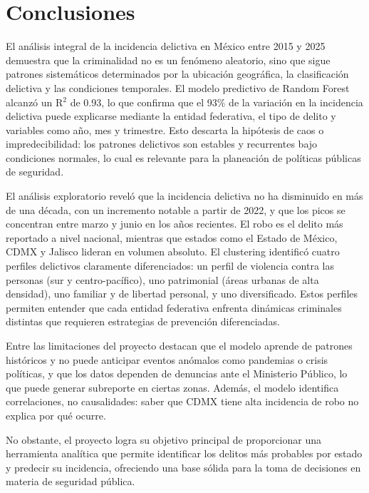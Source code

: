 \section{Conclusiones}

El análisis integral de la incidencia delictiva en México entre 2015 y 2025 demuestra que la criminalidad
no es un fenómeno aleatorio, sino que sigue patrones sistemáticos determinados por la ubicación geográfica,
la clasificación delictiva y las condiciones temporales. El modelo predictivo de Random Forest alcanzó un R$^2$
de 0.93, lo que confirma que el 93\% de la variación en la incidencia delictiva puede explicarse mediante la
entidad federativa, el tipo de delito y variables como año, mes y trimestre. Esto descarta la hipótesis de
caos o impredecibilidad: los patrones delictivos son estables y recurrentes bajo condiciones normales, lo
cual es relevante para la planeación de políticas públicas de seguridad.

El análisis exploratorio reveló que la incidencia delictiva no ha disminuido en más de una década, con un
incremento notable a partir de 2022, y que los picos se concentran entre marzo y junio en los años recientes.
El robo es el delito más reportado a nivel nacional, mientras que estados como el Estado de México, CDMX y
Jalisco lideran en volumen absoluto. El clustering identificó cuatro perfiles delictivos claramente
diferenciados: un perfil de violencia contra las personas (sur y centro-pacífico), uno patrimonial
(áreas urbanas de alta densidad), uno familiar y de libertad personal, y uno diversificado. Estos perfiles
permiten entender que cada entidad federativa enfrenta dinámicas criminales distintas que requieren
estrategias de prevención diferenciadas.

Entre las limitaciones del proyecto destacan que el modelo aprende de patrones históricos y no puede
anticipar eventos anómalos como pandemias o crisis políticas, y que los datos dependen de denuncias
ante el Ministerio Público, lo que puede generar subreporte en ciertas zonas. Además, el modelo identifica
correlaciones, no causalidades: saber que CDMX tiene alta incidencia de robo no explica por qué ocurre.

No obstante, el proyecto logra su objetivo principal de proporcionar una herramienta analítica que permite
identificar los delitos más probables por estado y predecir su incidencia, ofreciendo una base sólida para
la toma de decisiones en materia de seguridad pública.